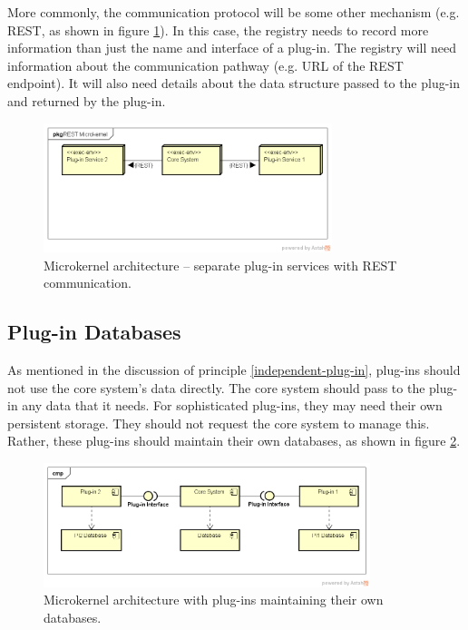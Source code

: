 More commonly, the communication protocol will be some other mechanism (e.g. REST, as shown in figure \ref{fig:rest-microkernel}).
In this case, the registry needs to record more information than just the name and interface of a plug-in.
The registry will need information about the communication pathway (e.g. URL of the REST endpoint).
It will also need details about the data structure passed to the plug-in and returned by the plug-in.

\begin{figure}[h!]
    \centering
    \includegraphics[trim=38 167 19 45,clip,width=0.75\textwidth]{diagrams/rest-microkernel.png}
    \caption{Microkernel architecture -- separate plug-in services with REST communication.}
    \label{fig:rest-microkernel}
\end{figure}

\subsection{Plug-in Databases}

As mentioned in the discussion of principle \ref{independent-plug-in}, plug-ins should not use the core system's data directly.
The core system should pass to the plug-in any data that it needs.
For sophisticated plug-ins, they may need their own persistent storage.
They should not request the core system to manage this.
Rather, these plug-ins should maintain their own databases, as shown in figure \ref{fig:plug-in-dbs}.

\begin{figure}[h!]
    \centering
    \includegraphics[trim=39 81 24 50,clip,width=0.85\textwidth]{diagrams/plug-in-databases.png}
    \caption{Microkernel architecture with plug-ins maintaining their own databases.}
    \label{fig:plug-in-dbs}
\end{figure}

